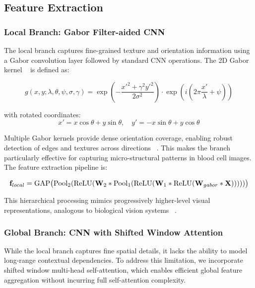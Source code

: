 \documentclass[12pt]{article}
\begin{document}
\subsection{Feature Extraction}

\subsubsection{Local Branch: Gabor Filter-aided CNN}

The local branch captures fine-grained texture and orientation information using a Gabor convolution layer followed by standard CNN operations. The 2D Gabor kernel ~\cite{b1} is defined as:

\begin{equation*}
g(x, y; \lambda, \theta, \psi, \sigma, \gamma)
=
\exp\left(-\frac{x'^2 + \gamma^2 y'^2}{2\sigma^2}\right)
\cdot
\exp\left(i\left(2\pi \frac{x'}{\lambda} + \psi\right)\right)
\end{equation*}

with rotated coordinates:
\begin{equation*}
x' = x\cos\theta + y\sin\theta,\quad
y' = -x\sin\theta + y\cos\theta
\end{equation*}

Multiple Gabor kernels provide dense orientation coverage, enabling robust detection of edges and textures across directions ~\cite{b2}. This makes the branch particularly effective for capturing micro-structural patterns in blood cell images. The feature extraction pipeline is:

\begin{equation*}
\resizebox{\columnwidth}{!}{$
\mathbf{f}_{local}
=
\mathrm{GAP}\big(
\mathrm{Pool}_2(
\mathrm{ReLU}(
\mathbf{W}_2 *
\mathrm{Pool}_1(
\mathrm{ReLU}(
\mathbf{W}_1 *
\mathrm{ReLU}(
\mathbf{W}_{gabor} * \mathbf{X}
)
)
)
)
)
\big)
$}
\end{equation*}

This hierarchical processing mimics progressively higher-level visual representations, analogous to biological vision systems ~\cite{b3}.


\subsubsection{Global Branch: CNN with Shifted Window Attention}

While the local branch captures fine spatial details, it lacks the ability to model long-range contextual dependencies. To address this limitation, we incorporate shifted window multi-head self-attention, which enables efficient global feature aggregation without incurring full self-attention complexity.
\end{document}
